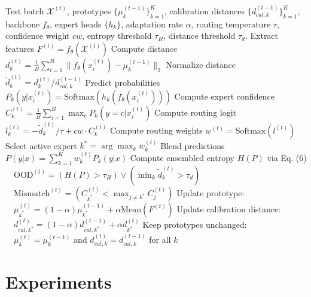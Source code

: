 \documentclass{article}
\theoremstyle{plain}
\theoremstyle{definition}
\theoremstyle{remark}
\begin{document}
\begin{algorithm}[tb]
  \caption{Gated EMA-Proto Test-Time Update}
  \label{alg:gated_ema}
  \begin{algorithmic}
     Test batch $\mathcal{X}^{(t)}$, prototypes $\{\mu_k^{(t-1)}\}_{k=1}^K$, calibration distances $\{d_{cal, k}^{(t-1)}\}_{k=1}^K$, backbone $f_\theta$, expert heads $\{h_k\}$, adaptation rate $\alpha$, routing temperature $\tau$, confidence weight $cw$, entropy threshold $\tau_H$, distance threshold $\tau_d$.
    \STATE Extract features $F^{(t)} = f_\theta(\mathcal{X}^{(t)})$
    \STATE Compute distance $d_k^{(t)} = \frac{1}{B} \sum_{i=1}^B \| f_\theta(x_i^{(t)}) - \mu_k^{(t-1)} \|_2$
    \STATE Normalize distance $\tilde{d}_k^{(t)} = d_k^{(t)} / d_{cal, k}^{(t-1)}$
    \STATE Predict probabilities $P_k(y | x_i^{(t)}) = \text{Softmax}(h_k(f_\theta(x_i^{(t)})))$
    \STATE Compute expert confidence $C_k^{(t)} = \frac{1}{B} \sum_{i=1}^B \max_c P_k(y=c | x_i^{(t)})$
    \STATE Compute routing logit $l_k^{(t)} = -\tilde{d}_k^{(t)} / \tau + cw \cdot C_k^{(t)}$
    \ENDFOR
    \STATE Compute routing weights $w^{(t)} = \text{Softmax}(l^{(t)})$
    \STATE Select active expert $k^* = \arg\max_k w_k^{(t)}$
    \STATE Blend predictions $P(y|x) = \sum_{k=1}^K w_k^{(t)} P_k(y|x)$
    \STATE Compute ensembled entropy $H(P)$ via Eq. (6)
    \STATE $\quad \text{OOD}^{(t)} = (H(P) > \tau_H) \lor (\min_k \tilde{d}_k^{(t)} > \tau_d)$
    \STATE $\quad \text{Mismatch}^{(t)} = (C_{k^*}^{(t)} < \max_{j \neq k^*} C_j^{(t)})$
    \STATE Update prototype: 
    \STATE $\quad \mu_{k^*}^{(t)} = (1-\alpha) \mu_{k^*}^{(t-1)} + \alpha \text{Mean}(F^{(t)})$
    \STATE Update calibration distance: 
    \STATE $\quad d_{cal, k^*}^{(t)} = (1-\alpha) d_{cal, k^*}^{(t-1)} + \alpha d_{k^*}^{(t)}$
    \ELSE
    \STATE Keep prototypes unchanged: 
    \STATE $\quad \mu_k^{(t)} = \mu_k^{(t-1)}$ and $d_{cal, k}^{(t)} = d_{cal, k}^{(t-1)}$ for all $k$
    \ENDIF
  \end{algorithmic}
\end{algorithm}

\section{Experiments}
\label{sec:experiments}
\end{document}
